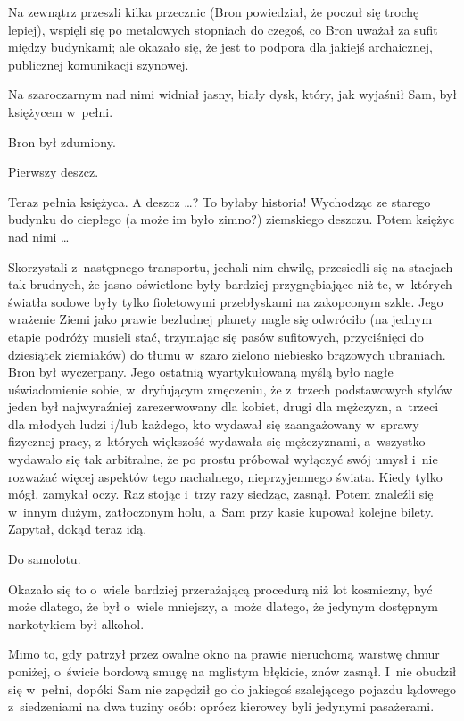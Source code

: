 \documentclass[oneside,polish,11pt,rmheadings]{mwbk}
\begin{document}
Na zewnątrz przeszli kilka przecznic (Bron powiedział, że poczuł się trochę lepiej), wspięli się po metalowych stopniach do czegoś, co Bron uważał za sufit między budynkami; ale okazało się, że jest to podpora dla jakiejś archaicznej, publicznej komunikacji szynowej. 

Na szaroczarnym nad nimi widniał jasny, biały dysk, który, jak wyjaśnił Sam, był księżycem w~pełni. 

Bron był zdumiony. 

Pierwszy deszcz. 

Teraz pełnia księżyca. A deszcz \ldots ? To byłaby historia! Wychodząc ze starego budynku do ciepłego (a może im było zimno?) ziemskiego deszczu. Potem księżyc nad nimi  \ldots  

Skorzystali z~następnego transportu, jechali nim chwilę, przesiedli się na stacjach tak brudnych, że jasno oświetlone były bardziej przygnębiające niż te, w~których światła sodowe były tylko fioletowymi przebłyskami na zakopconym szkle. Jego wrażenie Ziemi jako prawie bezludnej planety nagle się odwróciło (na jednym etapie podróży musieli stać, trzymając się pasów sufitowych, przyciśnięci do dziesiątek ziemiaków) do tłumu w~szaro \dywiz zielono \dywiz niebiesko \dywiz brązowych ubraniach. Bron był  wyczerpany. Jego ostatnią wyartykułowaną myślą było nagłe uświadomienie sobie, w~dryfującym zmęczeniu, że z~trzech podstawowych stylów jeden był najwyraźniej zarezerwowany dla kobiet, drugi dla mężczyzn, a~trzeci dla młodych ludzi i/lub każdego, kto wydawał się zaangażowany w~sprawy fizycznej pracy, z~których większość wydawała się mężczyznami, a~wszystko wydawało się tak arbitralne, że po prostu próbował wyłączyć swój umysł i~nie rozważać więcej aspektów tego nachalnego, nieprzyjemnego świata. Kiedy tylko mógł, zamykał oczy. Raz stojąc i~trzy razy siedząc, zasnął. Potem znaleźli się w~innym dużym, zatłoczonym holu, a~Sam przy kasie kupował kolejne bilety. Zapytał, dokąd teraz idą. 

Do samolotu. 

Okazało się to o~wiele bardziej przerażającą procedurą niż lot kosmiczny, być może dlatego, że był o~wiele mniejszy, a~może dlatego, że jedynym dostępnym narkotykiem był alkohol. 

Mimo to, gdy patrzył przez owalne okno na prawie nieruchomą warstwę chmur poniżej, o~świcie bordową smugę na mglistym błękicie, znów zasnął. I~nie obudził się w~pełni, dopóki Sam nie zapędził go do jakiegoś szalejącego pojazdu lądowego z~siedzeniami na dwa tuziny osób: oprócz kierowcy byli jedynymi pasażerami. 
\end{document}
